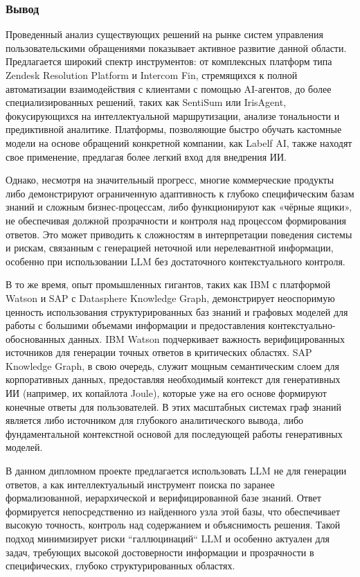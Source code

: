 

\subsubsection{Вывод}

Проведенный анализ существующих решений на рынке систем управления пользовательскими обращениями показывает активное развитие данной области. Предлагается широкий спектр инструментов: от комплексных платформ типа Zendesk Resolution Platform и Intercom Fin, стремящихся к полной автоматизации взаимодействия с клиентами с помощью AI-агентов, до более специализированных решений, таких как SentiSum или IrisAgent, фокусирующихся на интеллектуальной маршрутизации, анализе тональности и предиктивной аналитике. Платформы, позволяющие быстро обучать кастомные модели на основе обращений конкретной компании, как Labelf AI, также находят свое применение, предлагая более легкий вход для внедрения ИИ.

Однако, несмотря на значительный прогресс, многие коммерческие продукты либо демонстрируют ограниченную адаптивность к глубоко специфическим базам знаний и сложным бизнес-процессам, либо функционируют как «чёрные ящики», не обеспечивая должной прозрачности и контроля над процессом формирования ответов. Это может приводить к сложностям в интерпретации поведения системы и рискам, связанным с генерацией неточной или нерелевантной информации, особенно при использовании LLM без достаточного контекстуального контроля.

В то же время, опыт промышленных гигантов, таких как IBM с платформой Watson и SAP с Datasphere Knowledge Graph, демонстрирует неоспоримую ценность использования структурированных баз знаний и графовых моделей для работы с большими объемами информации и предоставления контекстуально-обоснованных данных. IBM Watson подчеркивает важность верифицированных источников для генерации точных ответов в критических областях. SAP Knowledge Graph, в свою очередь, служит мощным семантическим слоем для корпоративных данных, предоставляя необходимый контекст для генеративных ИИ (например, их копайлота Joule), которые уже на его основе формируют конечные ответы для пользователей. В этих масштабных системах граф знаний является либо источником для глубокого аналитического вывода, либо фундаментальной контекстной основой для последующей работы генеративных моделей.

В данном дипломном проекте предлагается использовать LLM не для генерации ответов, а как интеллектуальный инструмент поиска по заранее формализованной, иерархической и верифицированной базе знаний. Ответ формируется непосредственно из найденного узла этой базы, что обеспечивает высокую точность, контроль над содержанием и объяснимость решения. Такой подход минимизирует риски ``галлюцинаций`` LLM и особенно актуален для задач, требующих высокой достоверности информации и прозрачности в специфических, глубоко структурированных областях.

